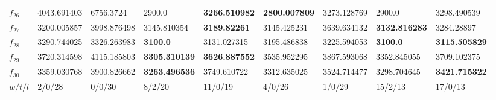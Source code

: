 \begin{table*}[t!]
\begin{tabular}{|p{0.8cm}|p{1.6cm}|p{1.6cm}|p{1.6cm}|p{1.6cm}|p{1.6cm}|p{1.6cm}|p{1.6cm}|p{1.6cm}|}
$f_{26}$  & 4043.691403 & 6756.3724 & 2900.0 & \textbf{3266.510982} & \textbf{2800.007809} & 3273.128769 & 2900.0 & 3298.490539 \\ 
$f_{27}$  & 3200.005857 & 3998.876498 & 3145.810354 & \textbf{3189.82261} & 3145.425231 & 3639.634132 & \textbf{3132.816283} & 3284.28897 \\ 
$f_{28}$  & 3290.744025 & 3326.263983 & \textbf{3100.0} & 3131.027315 & 3195.486838 & 3225.594053 & \textbf{3100.0} & \textbf{3115.505829} \\ 
$f_{29}$  & 3720.314598 & 4115.185803 & \textbf{3305.310139} & \textbf{3626.887552} & 3535.952295 & 3867.593068 & 3352.845055 & 3709.102375 \\ 
$f_{30}$  & 3359.030768 & 3900.826662 & \textbf{3263.496536} & 3749.610722 & 3312.635025 & 3524.714477 & 3298.704645 & \textbf{3421.715322} \\ 
\hline
$w/t/l$  & 2/0/28 & 0/0/30 & 8/2/20 & 11/0/19 & 4/0/26 & 1/0/29 & 15/2/13 & 17/0/13 \\
\hline
\end{tabular}
\end{table*}
\endgroup

